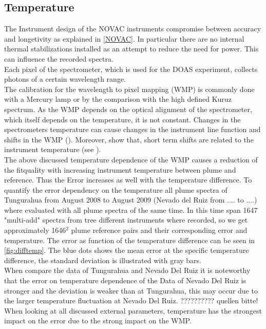 \documentclass  [
  paper    = a4,
  BCOR     = 10mm,
  twoside,
  fontsize = 12pt,
  fleqn,
  toc      = bibnumbered,
  toc      = listofnumbered,
  numbers  = noendperiod,
  headings = normal,
  listof   = leveldown,
  version  = 3.03
]                                       {scrreprt}
\begin{document}
	\subsection{Temperature}
	The Instrument design of the NOVAC instruments compromise between accuracy and longetivity as explained in \cref{NOVAC}. In particular there are no internal thermal stabilizations installed as an attempt to reduce the need for power. This can influence the recorded spectra.\\	
	Each pixel of the spectrometer, which is used for the DOAS experiment, collects photons of a certain wavelength range.\\
	The calibration for the wavelength to pixel mapping (WMP) is commonly done with a Mercury lamp or by the comparison with the high defined Kuruz spectrum.
	As the WMP depends on the optical alignment of the spectrometer, which itself depends on the temperature, it is not constant.
	Changes in the spectrometers temperature can cause changes in the instrument line function and shifts in the WMP (\cite{pinardi2007influence}). 
	Moreover, \cite{WarnachSimon} show that, short term shifts are related to the instrument temperature (see ).\\
	The above discussed temperature dependence of the WMP causes a reduction of the fitquality with increasing instrument temperature between plume and reference. Thus the  Error increases as well with the temperature difference. To quantify the  error dependency on the temperature all plume spectra of Tungurahua from August 2008 to August 2009 (Nevado del Ruiz from .... to ....) where evaluated with all plume spectra of the same time. In this time span 1647 "multi-add" spectra from tree different instruments where recorded, so we get approximately 1646$^2$ plume reference pairs and their corresponding  error and temperature. The  error as function of the temperature difference can be seen in \cref{fig:difftemp}. The blue dots shows the mean  error at the specific temperature difference, the standard deviation is illustrated with gray bars.\\
	When compare the data of Tungurahua  and Nevado Del Ruiz it is noteworthy that the  error on temperature dependence of the Data of Nevado Del Ruiz is stronger and the deviation is weaker than at Tungurahua, this may occur due to the larger temperature fluctuation at Nevado Del Ruiz. ?????????? quellen bitte!\\
	When looking at all discussed external parameters, temperature has  the strongest impact on the  error due to the strong impact on the WMP.
\end{document}
